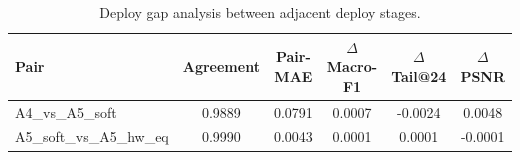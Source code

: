 \begin{table}[t]
\centering
\caption{Deploy gap analysis between adjacent deploy stages.}
\label{tab:deploy_gap}
\setlength{\tabcolsep}{4pt}
\begin{tabular}{lccccc}
\toprule
Pair & Agreement & Pair-MAE & $\Delta$Macro-F1 & $\Delta$Tail@24 & $\Delta$PSNR \\
\midrule
A4_vs_A5_soft & 0.9889 & 0.0791 & 0.0007 & -0.0024 & 0.0048 \\
A5_soft_vs_A5_hw_eq & 0.9990 & 0.0043 & 0.0001 & 0.0001 & -0.0001 \\
\bottomrule
\end{tabular}
\end{table}
